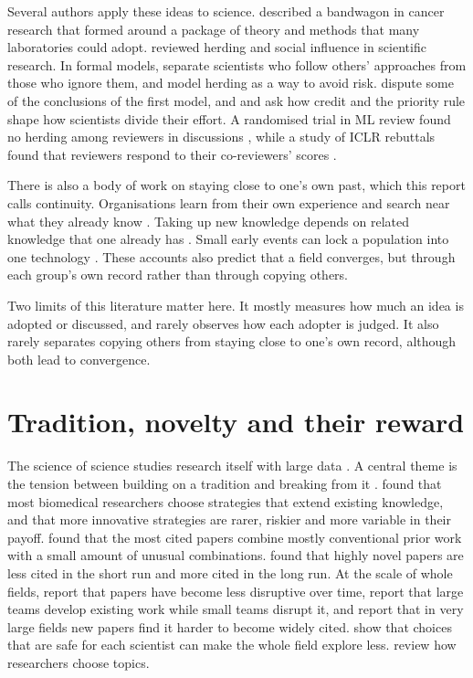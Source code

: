 Several authors apply these ideas to science. \citet{fujimura1988molecular} described a bandwagon in cancer research
that formed around a package of theory and methods that many laboratories could adopt. \citet{baddeley2015herding}
reviewed herding and social influence in scientific research. In formal models, \citet{weisberg2009epistemic}
separate scientists who follow others' approaches from those who ignore them, and \citet{weisberg2013modeling} model
herding as a way to avoid risk. \citet{alexander2015epistemic} dispute some of the conclusions of the first model, and
\citet{kitcher1990division} and \citet{strevens2003role} ask how credit and the priority rule shape how scientists
divide their effort. A randomised trial in ML review found no herding among reviewers in discussions
\citep{stelmakh2023large}, while a study of ICLR rebuttals found that reviewers respond to their co-reviewers' scores
\citep{kargaran2025insights}.

There is also a body of work on staying close to one's own past, which this report calls continuity. Organisations
learn from their own experience \citep{levitt1988organizational} and search near what they already know
\citep{march1991exploration,stuart1996local}. Taking up new knowledge depends on related knowledge that one already
has \citep{cohen1990absorptive}. Small early events can lock a population into one technology
\citep{arthur1989competing}. These accounts also predict that a field converges, but through each group's own record
rather than through copying others.

Two limits of this literature matter here. It mostly measures how much an idea is adopted or discussed, and rarely
observes how each adopter is judged. It also rarely separates copying others from staying close to one's own record,
although both lead to convergence.

\section{Tradition, novelty and their reward}
\label{sec:lit-novelty}

The science of science studies research itself with large data \citep{fortunato2018science}. A central theme is the
tension between building on a tradition and breaking from it \citep{kuhn1977essential}. \citet{foster2015tradition}
found that most biomedical researchers choose strategies that extend existing knowledge, and that more innovative
strategies are rarer, riskier and more variable in their payoff. \citet{uzzi2013atypical} found that the most cited
papers combine mostly conventional prior work with a small amount of unusual combinations. \citet{wang2017bias} found
that highly novel papers are less cited in the short run and more cited in the long run. At the scale of whole fields,
\citet{park2023papers} report that papers have become less disruptive over time, \citet{wu2019large} report that large
teams develop existing work while small teams disrupt it, and \citet{chu2021slowed} report that in very large fields new
papers find it harder to become widely cited. \citet{rzhetsky2015choosing} show that choices that are safe for each
scientist can make the whole field explore less. \citet{xiang2025research} review how researchers choose topics.

